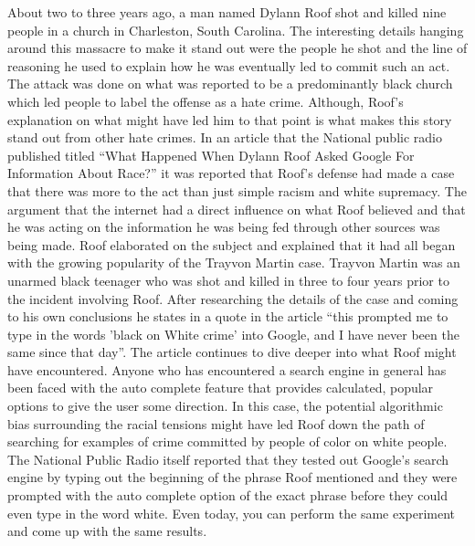 \documentclass[sigconf]{acmart}
\begin{document}
About two to three years ago, a man named Dylann Roof shot and killed nine people in a church in Charleston, South Carolina. The interesting details hanging around this massacre to make it stand out were the people he shot and the line of reasoning he used to explain how he was eventually led to commit such an act. The attack was done on what was reported to be a predominantly black church which led people to label the offense as a hate crime. Although, Roof's explanation on what might have led him to that point is what makes this story stand out from other hate crimes. In an article that the National public radio published titled ``What Happened When Dylann Roof Asked Google For Information About Race?'' it was reported that Roof's defense had made a case that there was more to the act than just simple racism and white supremacy\cite{Hersher2017}. The argument that the internet had a direct influence on what Roof believed and that he was acting on the information he was being fed through other sources was being made. Roof elaborated on the subject and explained that it had all began with the growing popularity of the Trayvon Martin case. Trayvon Martin was an unarmed black teenager who was shot and killed in three to four years prior to the incident involving Roof. After researching the details of the case and coming to his own conclusions he states in a quote in the article ``this prompted me to type in the words 'black on White crime' into Google, and I have never been the same since that day''\cite{Hersher2017}. The article continues to dive deeper into what Roof might have encountered. Anyone who has encountered a search engine in general has been faced with the auto complete feature that provides calculated, popular options to give the user some direction. In this case, the potential algorithmic bias surrounding the racial tensions might have led Roof down the path of searching for examples of crime committed by people of color on white people. The National Public Radio itself reported that they tested out Google's search engine by typing out the beginning of the phrase Roof mentioned and they were prompted with the auto complete option of the exact phrase before they could even type in the word white\cite{Hersher2017}. Even today, you can perform the same experiment and come up with the same results.
\end{document}

